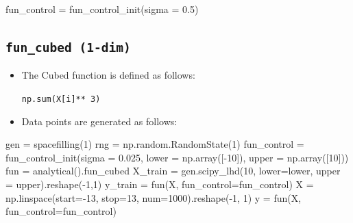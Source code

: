 \documentclass[
  letterpaper,
  DIV=11,
  numbers=noendperiod]{scrreprt}
\newenvironment{Shaded}{\begin{snugshade}}{\end{snugshade}}
\newcommand{\DecValTok}[1]{\textcolor[rgb]{0.68,0.00,0.00}{#1}}
\newcommand{\FloatTok}[1]{\textcolor[rgb]{0.68,0.00,0.00}{#1}}
\newcommand{\NormalTok}[1]{\textcolor[rgb]{0.00,0.23,0.31}{#1}}
\newcommand{\OperatorTok}[1]{\textcolor[rgb]{0.37,0.37,0.37}{#1}}
\begin{document}
\begin{Shaded}
\begin{Highlighting}[]
\NormalTok{fun\_control }\OperatorTok{=}\NormalTok{ fun\_control\_init(sigma }\OperatorTok{=} \FloatTok{0.5}\NormalTok{)}
\end{Highlighting}
\end{Shaded}

\subsection{\texorpdfstring{\texttt{fun\_cubed\ (1-dim)}}{fun\_cubed (1-dim)}}\label{fun_cubed-1-dim}

\begin{itemize}
\item
  The Cubed function is defined as follows:

  \texttt{np.sum(X{[}i{]}**\ 3)}
\item
  Data points are generated as follows:
\end{itemize}

\begin{Shaded}
\begin{Highlighting}[]
\NormalTok{gen }\OperatorTok{=}\NormalTok{ spacefilling(}\DecValTok{1}\NormalTok{)}
\NormalTok{rng }\OperatorTok{=}\NormalTok{ np.random.RandomState(}\DecValTok{1}\NormalTok{)}
\NormalTok{fun\_control }\OperatorTok{=}\NormalTok{ fun\_control\_init(sigma }\OperatorTok{=} \FloatTok{0.025}\NormalTok{,}
\NormalTok{                lower }\OperatorTok{=}\NormalTok{ np.array([}\OperatorTok{{-}}\DecValTok{10}\NormalTok{]),}
\NormalTok{                upper }\OperatorTok{=}\NormalTok{ np.array([}\DecValTok{10}\NormalTok{]))}
\NormalTok{fun }\OperatorTok{=}\NormalTok{ analytical().fun\_cubed}
\NormalTok{X\_train }\OperatorTok{=}\NormalTok{ gen.scipy\_lhd(}\DecValTok{10}\NormalTok{, lower}\OperatorTok{=}\NormalTok{lower, upper }\OperatorTok{=}\NormalTok{ upper).reshape(}\OperatorTok{{-}}\DecValTok{1}\NormalTok{,}\DecValTok{1}\NormalTok{)}
\NormalTok{y\_train }\OperatorTok{=}\NormalTok{ fun(X, fun\_control}\OperatorTok{=}\NormalTok{fun\_control)}
\NormalTok{X }\OperatorTok{=}\NormalTok{ np.linspace(start}\OperatorTok{={-}}\DecValTok{13}\NormalTok{, stop}\OperatorTok{=}\DecValTok{13}\NormalTok{, num}\OperatorTok{=}\DecValTok{1000}\NormalTok{).reshape(}\OperatorTok{{-}}\DecValTok{1}\NormalTok{, }\DecValTok{1}\NormalTok{)}
\NormalTok{y }\OperatorTok{=}\NormalTok{ fun(X, fun\_control}\OperatorTok{=}\NormalTok{fun\_control)}
\end{Highlighting}
\end{Shaded}
\end{document}
